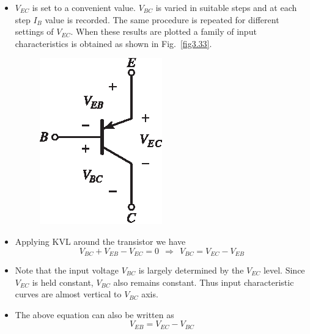 \begin{itemize}
\item 
$V_{EC}$ is set to a convenient value. $V_{BC}$ is varied in suitable steps and at each step $I_{B}$ value is recorded. The same procedure is repeated for different settings of $V_{EC}$. When these results are plotted a family of input characteristics is obtained as shown in Fig.~\ref{fig3.33}.
\begin{figure}[H]
\centering
\includegraphics[scale=.95]{chap2/Addfig2.29.eps}
\end{figure}

\itemsep=0pt
\item Applying KVL around the transistor we have
$$
V_{BC}+V_{EB}-V_{EC}=0 \ \ \Rightarrow \ \ V_{BC}=V_{EC}-V_{EB}
$$

\item
Note that the input voltage $V_{BC}$ is largely determined by the $V_{EC}$ level. Since $V_{EC}$ is held constant, $V_{BC}$ also remains constant. Thus input characteristic curves are almost vertical to $V_{BC}$ axis.

\item The above equation can also be written as
$$
V_{EB}=V_{EC}-V_{BC}
$$


\end{itemize}

